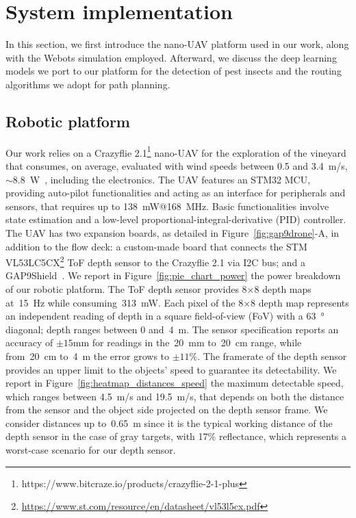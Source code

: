 \section{System implementation}

In this section, we first introduce the nano-UAV platform used in our work, along with the Webots simulation employed.
Afterward, we discuss the deep learning models we port to our platform for the detection of pest insects and the routing algorithms we adopt for path planning.


\subsection{Robotic platform} \label{subsec:robotic_platforms}

Our work relies on a Crazyflie 2.1\footnote{https://www.bitcraze.io/products/crazyflie-2-1-plus} nano-UAV for the exploration of the vineyard that consumes, on average, evaluated with wind speeds between 0.5 and \SI{3.4}{\meter/\second}, $\sim$\SI{8.8}{\watt}~\cite{9811834}, including the electronics.
The UAV features an STM32 MCU, providing auto-pilot functionalities and acting as an interface for peripherals and sensors, that requires up to \SI{138}{\milli\watt}@\SI{168}{\mega\hertz}.
Basic functionalities involve state estimation and a low-level proportional-integral-derivative (PID) controller.
The UAV has two expansion boards, as detailed in Figure~\ref{fig:gap9drone}-A, in addition to the flow deck: a custom-made board that connects the STM VL53LC5CX\footnote{\href{https://www.st.com/resource/en/datasheet/vl53l5cx.pdf}{https://www.st.com/resource/en/datasheet/vl53l5cx.pdf}} ToF depth sensor to the Crazyflie 2.1 via I2C bus; and a GAP9Shield~\cite{müller2024gap9shield150gopsaicapableultralow}.
We report in Figure~\ref{fig:pie_chart_power} the power breakdown of our robotic platform.
The ToF depth sensor provides 8$\times$8 depth maps at~\SI{15}{\hertz} while consuming~\SI{313}{\milli\watt}. 
Each pixel of the 8$\times$8 depth map represents an independent reading of depth in a square field-of-view (FoV) with a \SI{63}{\degree} diagonal; depth ranges between 0 and~\SI{4}{\meter}.
The sensor specification reports an accuracy of $\pm15$\si{\milli\meter} for readings in the~\SI{20}{\milli\meter} to~\SI{20}{\centi\meter} range, while from~\SI{20}{\centi\meter} to~\SI{4}{\meter} the error grows to $\pm11\%$. 
The framerate of the depth sensor provides an upper limit to the objects' speed to guarantee its detectability.  
We report in Figure~\ref{fig:heatmap_distances_speed} the maximum detectable speed, which ranges between \SI{4.5}{\meter/\second} and \SI{19.5}{\meter/\second}, that depends on both the distance from the sensor and the object side projected on the depth sensor frame.
We consider distances up to~\SI{0.65}{\meter} since it is the typical working distance of the depth sensor in the case of gray targets, with 17\% reflectance, which represents a worst-case scenario for our depth sensor.



